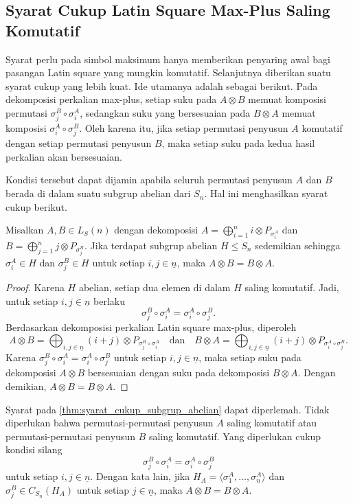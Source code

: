 \subsection{Syarat Cukup Latin Square Max-Plus Saling Komutatif}
Syarat perlu pada simbol maksimum hanya memberikan penyaring awal bagi pasangan Latin square yang mungkin komutatif. Selanjutnya diberikan suatu syarat cukup yang lebih kuat. Ide utamanya adalah sebagai berikut. Pada dekomposisi perkalian max-plus, setiap suku pada $A\otimes B$ memuat komposisi permutasi $\sigma_j^B\circ\sigma_i^A$, sedangkan suku yang bersesuaian pada $B\otimes A$ memuat komposisi $\sigma_i^A\circ\sigma_j^B$. Oleh karena itu, jika setiap permutasi penyusun $A$ komutatif dengan setiap permutasi penyusun $B$, maka setiap suku pada kedua hasil perkalian akan bersesuaian.

Kondisi tersebut dapat dijamin apabila seluruh permutasi penyusun $A$ dan $B$ berada di dalam suatu subgrup abelian dari $S_n$. Hal ini menghasilkan syarat cukup berikut.
\begin{teorema}\label{thm:syarat_cukup_subgrup_abelian}
  Misalkan $A,B\in L_S(n)$ dengan dekomposisi
  $A=\bigoplus_{i=1}^{n} i\otimes P_{\sigma_i^A}$ dan
  $B=\bigoplus_{j=1}^{n} j\otimes P_{\sigma_j^B}$.
  Jika terdapat subgrup abelian $H\le S_n$ sedemikian sehingga
  $\sigma_i^A\in H$ dan $\sigma_j^B\in H$ untuk setiap $i,j\in \underline{n}$, maka
  $A\otimes B=B\otimes A$.
\end{teorema}

\begin{proof}
  Karena $H$ abelian, setiap dua elemen di dalam $H$ saling komutatif. Jadi, untuk setiap $i,j\in \underline{n}$ berlaku
  \[
    \sigma_j^B\circ\sigma_i^A
    =
    \sigma_i^A\circ\sigma_j^B.
  \]
  Berdasarkan dekomposisi perkalian Latin square max-plus, diperoleh
  \[
    A\otimes B
    =
    \bigoplus_{i,j\in \underline{n}}
    (i+j)\otimes P_{\sigma_j^B\circ\sigma_i^A}
    \quad
    \text{dan}
    \quad
    B\otimes A
    =
    \bigoplus_{i,j\in \underline{n}}
    (i+j)\otimes P_{\sigma_i^A\circ\sigma_j^B}.
  \]
  Karena $\sigma_j^B\circ\sigma_i^A=\sigma_i^A\circ\sigma_j^B$ untuk setiap $i,j\in \underline{n}$, maka setiap suku pada dekomposisi $A\otimes B$ bersesuaian dengan suku pada dekomposisi $B\otimes A$. Dengan demikian, $A\otimes B=B\otimes A$.
\end{proof}

Syarat pada \autoref{thm:syarat_cukup_subgrup_abelian} dapat diperlemah.
Tidak diperlukan bahwa permutasi-permutasi penyusun $A$ saling komutatif
atau permutasi-permutasi penyusun $B$ saling komutatif. Yang diperlukan
cukup kondisi silang
\[
  \sigma_j^B\circ\sigma_i^A
  =
  \sigma_i^A\circ\sigma_j^B
\]
untuk setiap $i,j\in \underline{n}$. Dengan kata lain, jika
$H_A=\langle \sigma_1^A,\ldots,\sigma_n^A\rangle$ dan
$\sigma_j^B\in C_{S_n}(H_A)$ untuk setiap $j\in \underline{n}$, maka
$A\otimes B=B\otimes A$.

